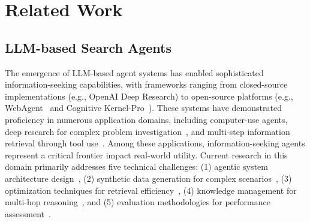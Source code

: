 \documentclass[11pt, letterpaper, logo, onecolumn, copyright, numbering]{paper_improved}
\let\cite\citep
\begin{document}
\section{Related Work}

\subsection{LLM-based Search Agents}
The emergence of LLM-based agent systems has enabled sophisticated information-seeking capabilities, with frameworks ranging from closed-source implementations (e.g., OpenAI Deep Research) to open-source platforms (e.g., WebAgent~\cite{wu2025webwalkerbenchmarkingllmsweb} and Cognitive Kernel-Pro~\cite{fang2025cognitivekernelproframeworkdeep}). These systems have demonstrated proficiency in numerous application domains, including computer-use agents, deep research for complex problem investigation~\cite{han2025deepresearchertesttimediffusion}, and multi-step information retrieval through tool use~\cite{xi2025survey}. Among these applications, information-seeking agents represent a critical frontier impact real-world utility.
Current research in this domain primarily addresses five technical challenges: (1) agentic system architecture design~\cite{zhang2025agentorchestra,zhou2025multiagentdesignoptimizingagents,xia-etal-2025-agentrm,fang2025webevolverenhancingwebagent}, (2) synthetic data generation for complex scenarios~\cite{wu2025webdancerautonomousinformationseeking,li2025websailor,tao2025webshaper}, (3) optimization techniques for retrieval efficiency~\cite{zhang2025rlvmrreinforcementlearningverifiable,fan2025ssrlselfsearchreinforcementlearning,sun2025zerosearchincentivizesearchcapability}, (4) knowledge management for multi-hop reasoning~\cite{zhang2025agentorchestra,xu2025amemagenticmemoryllm}, and (5) evaluation methodologies for performance assessment~\cite{zhuge2025agentasajudge,gou2025mind2web2evaluatingagentic}.%
\end{document}
